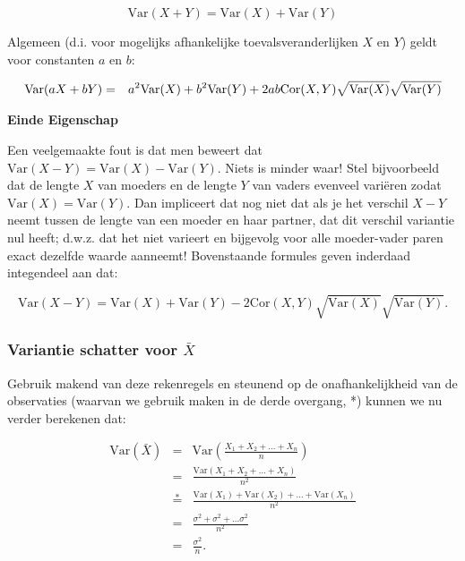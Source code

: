 \documentclass[
  12pt,dutch,coursenotes]{book}
\theoremstyle{definition}
\theoremstyle{definition}
\theoremstyle{definition}
\theoremstyle{definition}
\theoremstyle{remark}
\begin{document}
\begin{equation*}
\text{Var}(X+Y) = \text{Var}(X) + \text{Var}(Y)
\end{equation*}

Algemeen (d.i. voor mogelijks afhankelijke toevalsveranderlijken \(X\) en \(Y\)) geldt voor constanten \(a\) en \(b\):

\begin{eqnarray*}
\text{Var}(aX+bY) &=& a^2 \text{Var}(X) + b^2 \text{Var}(Y) + 2 ab {%
\text{Cor}}(X,Y)\sqrt{\text{Var}(X)}\sqrt{\text{Var}(Y)}
\end{eqnarray*}

\textbf{Einde Eigenschap}

Een veelgemaakte fout is dat men beweert dat \(\text{Var}(X-Y)=\text{Var}(X)-\text{Var}(Y)\). Niets is minder waar! Stel bijvoorbeeld dat de lengte \(X\) van moeders en de lengte \(Y\) van vaders evenveel variëren zodat \(\text{Var}(X)=\text{Var}(Y)\). Dan impliceert dat nog niet dat als je het verschil \(X-Y\) neemt tussen de lengte van een moeder en haar partner, dat dit verschil variantie nul heeft; d.w.z. dat het niet varieert en bijgevolg voor alle
moeder-vader paren exact dezelfde waarde aanneemt! Bovenstaande formules
geven inderdaad integendeel aan dat:

\begin{equation*}
\text{Var}(X-Y) = \text{Var}(X) + \text{Var}(Y) -2{\text{Cor}}(X,Y)\sqrt{\text{Var}(X)}\sqrt{\text{Var}(Y)}.
\end{equation*}

\hypertarget{variantie-schatter-voor-bar-x}{%
\subsubsection{\texorpdfstring{Variantie schatter voor \(\bar X\)}{Variantie schatter voor \textbackslash bar X}}\label{variantie-schatter-voor-bar-x}}

Gebruik makend van deze rekenregels en steunend
op de onafhankelijkheid van de observaties (waarvan we gebruik maken in de
derde overgang, *) kunnen we nu verder berekenen dat:

\begin{eqnarray*}
\text{Var}(\bar X)&=&\text{Var} \left(\frac{X_1+ X_2+ ... + X_n}{n}\right) \\
&= & \frac{\text{Var} (X_1+ X_2+ ... + X_n)}{n^2} \\
&\overset{*}{=} & \frac{\text{Var}(X_1)+ \text{Var}(X_2)+ ... + \text{Var}(X_n)}{n^2} \\
&=& \frac{\sigma^2 + \sigma^2 + ... \sigma^2}{n^2} \\
&= & \frac{\sigma^2}{n}.
\end{eqnarray*}
\end{document}
